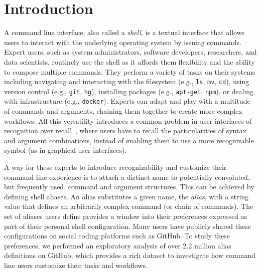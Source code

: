 \section{Introduction}

A command line interface, also called a \emph{shell}, is a textual interface that allows users to interact with the underlying operating system by issuing commands.
Expert users, such as system administrators, software developers, researchers, and data scientists, routinely use the shell as it affords them flexibility and the ability to compose multiple commands.
They perform a variety of tasks on their systems including navigating and interacting with the filesystem (e.g., \verb|ls|, \verb|mv|, \verb|cd|), using version control (e.g., \verb|git|, \verb|hg|), installing packages (e.g., \verb|apt-get|, \verb|npm|), or dealing with infrastructure (e.g., \verb|docker|).
Experts can adapt and play with a multitude of commands and arguments, chaining them together to create more complex workflows.
All this versatility introduces a common problem in user interfaces of recognition over recall~\cite{nielsen:05}, where users have to recall the particularities of syntax and argument combinations, instead of enabling them to use a more recognizable symbol (as in graphical user interfaces).

A way for these experts to introduce recognizability and customize their command line experience is to attach a distinct name to potentially convoluted, but frequently used, command and argument structures.
This can be achieved by defining shell aliases.
An alias substitutes a given name, the \emph{alias}, with a string value that defines an arbitrarily complex command (or chain of commands).
The set of aliases users define provides a window into their preferences expressed as part of their personal shell configuration.
Many users have publicly shared these configurations on social coding platforms such as GitHub.
To study these preferences, we performed an exploratory analysis of over 2.2 million alias definitions on GitHub, which provides a rich dataset to investigate how command line users customize their tasks and workflows.

